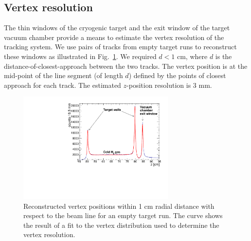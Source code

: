\subsection{Vertex resolution}

The thin windows of the cryogenic target and the exit window of the target
vacuum chamber provide a means to estimate the 
vertex resolution of the tracking system.  We use pairs of tracks from empty target runs to reconstruct these windows as illustrated in 
Fig.~\ref{fig:z-vertex}.  We required $d<1$ cm, where $d$ is the 
distance-of-closest-approach between the two tracks. The vertex position 
is at the mid-point of the line segment (of length $d$) defined by the points of closest approach for each track.
The estimated $z$-position resolution is 3 mm.

\begin{figure}[tbp]
\begin{center}
\includegraphics[width=0.7\textwidth]{figures/ZVertex.pdf}  
\caption{\label{fig:z-vertex} Reconstructed vertex positions within 1 cm radial
 distance with respect to the beam line for an empty target run.  The curve shows the result of a fit to the vertex distribution used to determine the vertex
resolution. 
}   
\end{center}  
\end{figure}

